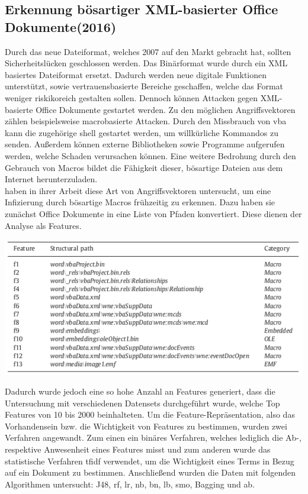 \documentclass[
    12pt, %
    DIV10,
    ngerman, %
    a4paper, %
    oneside, %
    titlepage, %
    parskip=half, %
    headings=normal, %
    listof=totoc, %
    bibliography=totoc, %
    index=totoc, %
    captions=tableheading, %
    final %
]{scrreprt}
\begin{document}
\subsection{Erkennung bösartiger XML-basierter Office Dokumente(2016)}
Durch das neue Dateiformat, welches  2007 auf den Markt gebracht hat, sollten Sicherheitslücken geschlossen werden.
Das Binärformat wurde durch ein	XML basiertes Dateiformat ersetzt. Dadurch werden neue digitale Funktionen unterstützt, sowie vertrauensbasierte Bereiche geschaffen, welche das Format weniger riskikoreich gestalten sollen. Dennoch können Attacken gegen XML-basierte Office Dokumente gestartet werden. Zu den möglichen Angriffsvektoren zählen beispielsweise macrobasierte Attacken. Durch den Missbrauch von \ac{vba} kann die zugehörige shell gestartet werden, um willkürliche Kommandos zu senden. Außerdem können externe Bibliotheken sowie Programme aufgerufen werden, welche Schaden verursachen können. Eine weitere Bedrohung durch den Gebrauch von Macros bildet die Fähigkeit dieser, bösartige Dateien aus dem Internet herunterzuladen.\\
\textcite{Cohen2016} haben in ihrer Arbeit diese Art von Angriffsvektoren untersucht, um eine Infizierung durch bösartige Macros frühzeitig zu erkennen. Dazu haben sie zunächst Office Dokumente in eine Liste von Pfaden konvertiert. Diese dienen der Analyse als Features.
\begin{center}
\includegraphics[scale=0.6]{img/pfade.png}
\label{fig:pe}
\end{center}
Dadurch wurde jedoch eine so hohe Anzahl an Features generiert, dass die Untersuchung mit verschiedenen Datensets durchgeführt wurde, welche Top Features von 10 bis 2000 beinhalteten. Um die Feature-Repräsentation, also das Vorhandensein bzw. die Wichtigkeit von Features zu bestimmen, wurden zwei Verfahren angewandt. Zum einen ein binäres Verfahren, welches lediglich die Ab-, respektive Anwesenheit eines Features misst und zum anderen wurde das statistische Verfahren \ac{tfidf} verwendet, um die Wichtigkeit eines Terms in Bezug auf ein Dokument zu bestimmen. Anschließend wurden die Daten mit folgenden Algorithmen untersucht: J48, \ac{rf}, \ac{lr}, \ac{nb}, \ac{bn}, \ac{lb}, \ac{smo}, Bagging und \ac{ab}. \\\\
\end{document}
